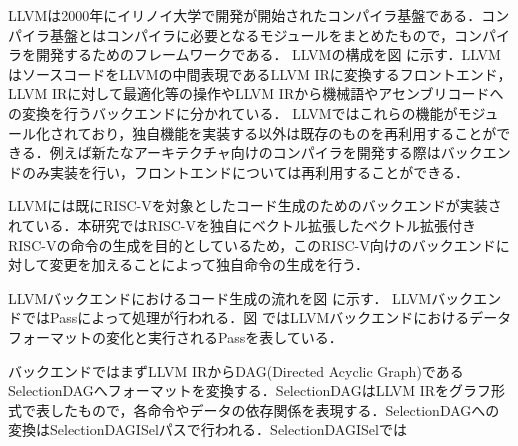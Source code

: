 LLVMは2000年にイリノイ大学で開発が開始されたコンパイラ基盤である．コンパイラ基盤とはコンパイラに必要となるモジュールをまとめたもので，コンパイラを開発するためのフレームワークである．
LLVMの構成を図%
に示す．LLVMはソースコードをLLVMの中間表現であるLLVM IRに変換するフロントエンド，LLVM IRに対して最適化等の操作やLLVM IRから機械語やアセンブリコードへの変換を行うバックエンドに分かれている．
LLVMではこれらの機能がモジュール化されており，独自機能を実装する以外は既存のものを再利用することができる．例えば新たなアーキテクチャ向けのコンパイラを開発する際はバックエンドのみ実装を行い，フロントエンドについては再利用することができる．

LLVMには既にRISC-Vを対象としたコード生成のためのバックエンドが実装されている．本研究ではRISC-Vを独自にベクトル拡張したベクトル拡張付きRISC-Vの命令の生成を目的としているため，このRISC-V向けのバックエンドに対して変更を加えることによって独自命令の生成を行う．

LLVMバックエンドにおけるコード生成の流れを図%
に示す．
LLVMバックエンドではPassによって処理が行われる．図%
ではLLVMバックエンドにおけるデータフォーマットの変化と実行されるPassを表している．

バックエンドではまずLLVM IRからDAG(Directed Acyclic Graph)であるSelectionDAGへフォーマットを変換する．SelectionDAGはLLVM IRをグラフ形式で表したもので，各命令やデータの依存関係を表現する．SelectionDAGへの変換はSelectionDAGISelパスで行われる．SelectionDAGISelでは